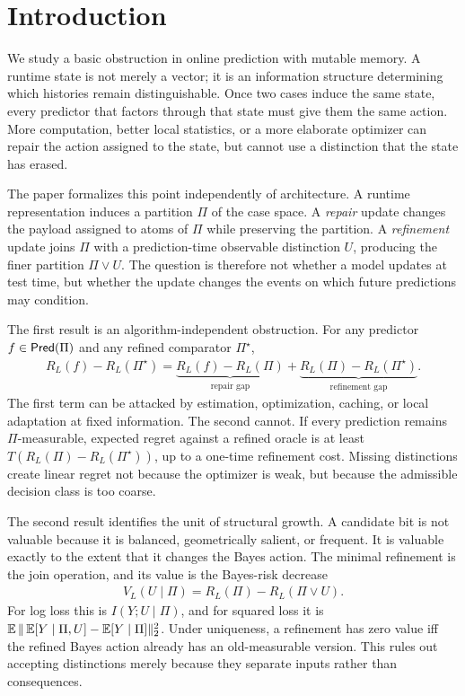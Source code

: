\section{Introduction}
\label{sec:main-intro}

We study a basic obstruction in online prediction with mutable memory. A runtime state is not merely a vector; it is an information structure determining which histories remain distinguishable. Once two cases induce the same state, every predictor that factors through that state must give them the same action. More computation, better local statistics, or a more elaborate optimizer can repair the action assigned to the state, but cannot use a distinction that the state has erased.

The paper formalizes this point independently of architecture. A runtime representation induces a partition $\Pi$ of the case space. A \emph{repair} update changes the payload assigned to atoms of $\Pi$ while preserving the partition. A \emph{refinement} update joins $\Pi$ with a prediction-time observable distinction $U$, producing the finer partition $\Pi\vee U$. The question is therefore not whether a model updates at test time, but whether the update changes the events on which future predictions may condition.

The first result is an algorithm-independent obstruction. For any predictor $f\in\mathsf{Pred}(\Pi)$ and any refined comparator $\Pi^\star$,
\begin{align*}
R_L(f)-R_L(\Pi^\star)
=
\underbrace{R_L(f)-R_L(\Pi)}_{\text{repair gap}}
+
\underbrace{R_L(\Pi)-R_L(\Pi^\star)}_{\text{refinement gap}}.
\end{align*}
The first term can be attacked by estimation, optimization, caching, or local adaptation at fixed information. The second cannot. If every prediction remains $\Pi$-measurable, expected regret against a refined oracle is at least $T(R_L(\Pi)-R_L(\Pi^\star))$, up to a one-time refinement cost. Missing distinctions create linear regret not because the optimizer is weak, but because the admissible decision class is too coarse.

The second result identifies the unit of structural growth. A candidate bit is not valuable because it is balanced, geometrically salient, or frequent. It is valuable exactly to the extent that it changes the Bayes action. The minimal refinement is the join operation, and its value is the Bayes-risk decrease
\begin{align*}
V_L(U\mid\Pi)=R_L(\Pi)-R_L(\Pi\vee U).
\end{align*}
For log loss this is $I(Y;U\mid\Pi)$, and for squared loss it is $\operatorname*{\mathbb{E}}\|\operatorname*{\mathbb{E}}[Y\mid\Pi,U]-\operatorname*{\mathbb{E}}[Y\mid\Pi]\|_2^2$. Under uniqueness, a refinement has zero value iff the refined Bayes action already has an old-measurable version. This rules out accepting distinctions merely because they separate inputs rather than consequences.

